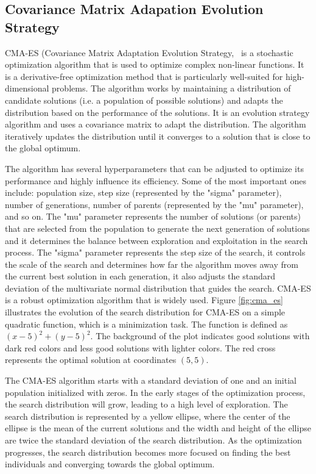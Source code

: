 \subsection{Covariance Matrix Adapation Evolution Strategy}

CMA-ES (Covariance Matrix Adaptation Evolution Strategy,~\cite{hansen_cma-espycma_2019} is a stochastic optimization algorithm that is used to optimize complex non-linear functions. It is a derivative-free optimization method that is particularly well-suited for high-dimensional problems. The algorithm works by maintaining a distribution of candidate solutions (i.e. a population of possible solutions) and adapts the distribution based on the performance of the solutions. It is an evolution strategy algorithm and uses a covariance matrix to adapt the distribution. The algorithm iteratively updates the distribution until it converges to a solution that is close to the global optimum.

The algorithm has several hyperparameters that can be adjusted to optimize its performance and highly influence its efficiency. Some of the most important ones include: population size, step size (represented by the "sigma" parameter), number of generations, number of parents (represented by the "mu" parameter), and so on. The "mu" parameter represents the number of solutions (or parents) that are selected from the population to generate the next generation of solutions and it determines the balance between exploration and exploitation in the search process. The "sigma" parameter represents the step size of the search, it controls the scale of the search and determines how far the algorithm moves away from the current best solution in each generation, it also adjusts the standard deviation of the multivariate normal distribution that guides the search. CMA-ES is a robust optimization algorithm that is widely used. Figure \ref{fig:cma_es} illustrates the evolution of the search distribution for CMA-ES on a simple quadratic function, which is a minimization task. The function is defined as $(x - 5) ^ 2 + (y - 5) ^ 2$. The background of the plot indicates good solutions with dark red colors and less good solutions with lighter colors. The red cross represents the optimal solution at coordinates $(5,5)$. 

The CMA-ES algorithm starts with a standard deviation of one and an initial population initialized with zeros. In the early stages of the optimization process, the search distribution will grow, leading to a high level of exploration. The search distribution is represented by a yellow ellipse, where the center of the ellipse is the mean of the current solutions and the width and height of the ellipse are twice the standard deviation of the search distribution. As the optimization progresses, the search distribution becomes more focused on finding the best individuals and converging towards the global optimum.

